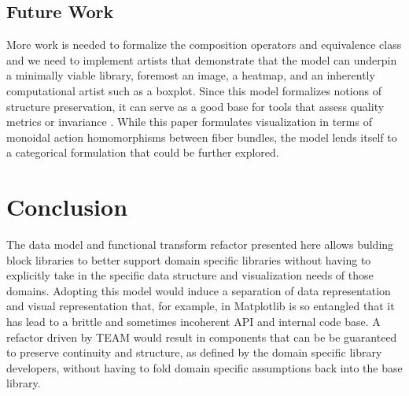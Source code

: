 \documentclass[journal]{vgtc}                %
\begin{document}
\subsection{Future Work}
More work is needed to formalize the composition operators and equivalence class \vartisteq and  we need to implement artists that demonstrate that the model can underpin a minimally viable library, foremost an image\cite{haber1990visualization,hansen2011visualization}, a heatmap\cite{wilkinsonHistoryClusterHeat2009,loua1873atlas}, and an inherently computational artist such as a boxplot\cite{wickham40YearsBoxplots2011}. Since this model formalizes notions of structure preservation, it can serve as a good base for tools that assess quality metrics\cite{bertiniQualityMetricsHighdimensional2011a} or invariance \cite{kindlmannAlgebraicProcessVisualization2014}. While this paper formulates visualization in terms of monoidal action homomorphisms between fiber bundles, the model lends itself to a categorical formulation\cite{fongInvitationAppliedCategory2019,milewskiCategoryTheoryProgrammers} that could be further explored. 

\section{Conclusion}
The data model and functional transform refactor presented here allows bulding block libraries to better support domain specific libraries without having to explicitly take in the specific data structure and visualization needs of those domains. Adopting this model would induce a separation of data representation and visual representation that, for example, in Matplotlib is so entangled that it has lead to a brittle and sometimes incoherent API and internal code base. A refactor driven by TEAM would result in components that can be be guaranteed to preserve continuity and structure, as defined by the domain specific library developers, without having to fold domain specific assumptions back into the base library. 


%

%
%
%

\end{document}
